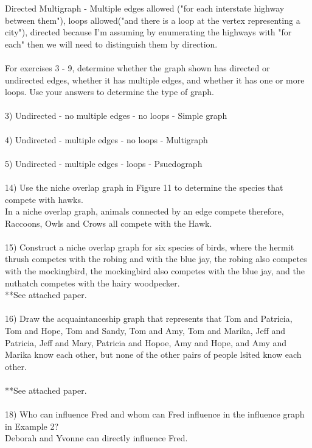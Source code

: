 \documentclass{article}
\begin{document}
\begin{flushleft}
Directed Multigraph - Multiple edges allowed ("for each interstate highway between them"), loops allowed("and there is a loop at the vertex representing a city"), directed because I'm assuming by enumerating the highways with "for each" then we will need to distinguish them by direction. \\
~\\
\setlength\parindent{0pt}For exercises 3 - 9, determine whether the graph shown has directed or undirected edges, whether it has multiple edges, and whether it has one or more loops.  Use your answers to determine the type of graph. \\
~\\
3) Undirected - no multiple edges - no loops - Simple graph \\
~\\
4) Undirected - multiple edges - no loops - Multigraph \\
~\\
5) Undirected - multiple edges - loops - Psuedograph \\
~\\
14) Use the niche overlap graph in Figure 11 to determine the species that compete with hawks. \\
In a niche overlap graph, animals connected by an edge compete therefore, Raccoons, Owls and Crows all compete with the Hawk.  \\
~\\
15) Construct a niche overlap graph for six species of birds, where the hermit thrush competes with the robing and with the blue jay, the robing also competes with the mockingbird, the mockingbird also competes with the blue jay, and the nuthatch competes with the hairy woodpecker. \\
**See attached paper.\\
~\\
16) Draw the acquaintanceship graph that represents that Tom and Patricia, Tom and Hope, Tom and Sandy, Tom and Amy, Tom and Marika, Jeff and Patricia, Jeff and Mary, Patricia and Hopoe, Amy and Hope, and Amy and Marika know each other, but none of the other pairs of people lsited know each other. \\
~\\
**See attached paper. \\
~\\
18) Who can influence Fred and whom can Fred influence in the influence graph in Example 2? \\
Deborah and Yvonne can directly influence Fred. \\

\end{flushleft}
\end{document}
